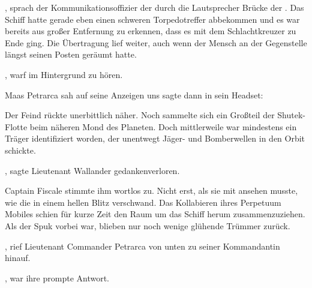 , sprach der Kommunikationsoffizier der  durch die Lautsprecher Brücke der . Das Schiff hatte gerade eben einen schweren Torpedotreffer abbekommen und es war bereits aus großer Entfernung zu erkennen, dass es mit dem Schlachtkreuzer zu Ende ging. Die Übertragung lief weiter, auch wenn der Mensch an der Gegenstelle längst seinen Posten geräumt hatte.

\par

, warf im Hintergrund zu hören. 

\par

Maas Petrarca sah auf seine Anzeigen uns sagte dann in sein Headset: 

\par

Der Feind rückte unerbittlich näher. Noch sammelte sich ein Großteil der Shutek-Flotte beim näheren Mond des Planeten. Doch mittlerweile war mindestens ein Träger identifiziert worden, der unentwegt Jäger- und Bomberwellen in den Orbit schickte.

\par

, sagte Lieutenant Wallander gedankenverloren.

\par

Captain Fiscale stimmte ihm wortlos zu. Nicht erst, als sie mit ansehen musste, wie die  in einem hellen Blitz verschwand. Das Kollabieren ihres Perpetuum Mobiles schien für kurze Zeit den Raum um das Schiff herum zusammenzuziehen. Als der Spuk vorbei war, blieben nur noch wenige glühende Trümmer zurück.

\par

, rief Lieutenant Commander Petrarca von unten zu seiner Kommandantin hinauf.

\par

, war ihre prompte Antwort. 

